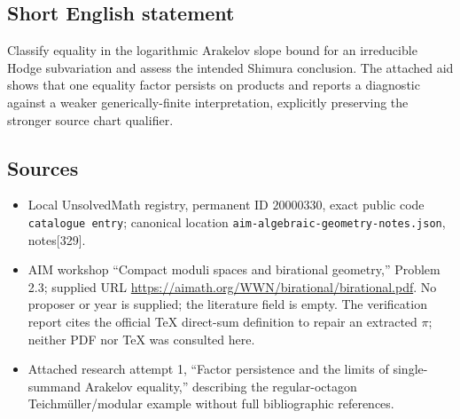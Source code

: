 \documentclass[11pt]{article}
\begin{document}
\subsection{Short English statement}
Classify equality in the logarithmic Arakelov slope bound for an irreducible Hodge subvariation and assess the intended Shimura conclusion. The attached aid shows that one equality factor persists on products and reports a diagnostic against a weaker generically-finite interpretation, explicitly preserving the stronger source chart qualifier.
\subsection{Sources}
\begin{itemize}
\item Local UnsolvedMath registry, permanent ID \(20000330\), exact public code \texttt{catalogue entry}; canonical location \texttt{aim-algebraic-geometry-notes.json}, notes[329].
\item AIM workshop ``Compact moduli spaces and birational geometry,'' Problem 2.3; supplied URL \url{https://aimath.org/WWN/birational/birational.pdf}. No proposer or year is supplied; the literature field is empty. The verification report cites the official TeX direct-sum definition to repair an extracted \(\pi\); neither PDF nor TeX was consulted here.
\item Attached research attempt 1, ``Factor persistence and the limits of single-summand Arakelov equality,'' describing the regular-octagon Teichm\"uller/modular example without full bibliographic references.
\end{itemize}
\end{document}
